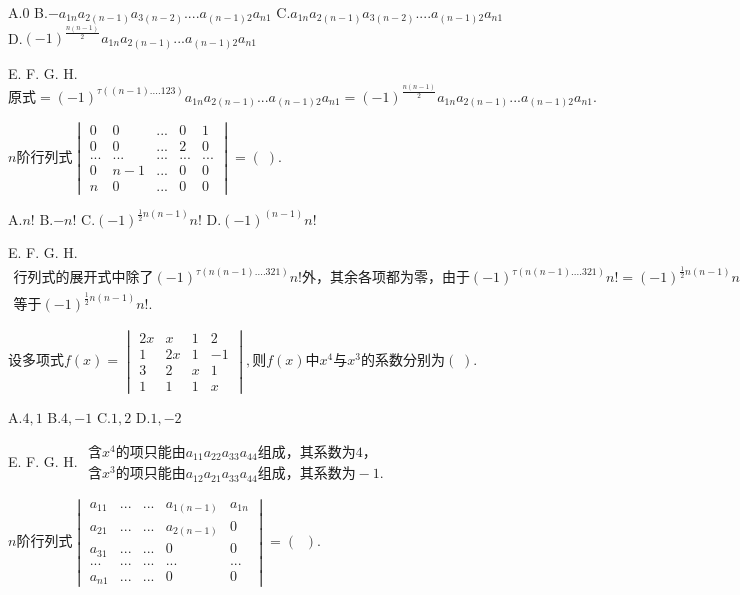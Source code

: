 A.$0$   B.$-a_{1n}a_{2(n-1)}a_{3(n-2)}....a_{(n-1)2}a_{n1}$   C.$a_{1n}a_{2(n-1)}a_{3(n-2)}....a_{(n-1)2}a_{n1}$   D.$(-1)^{\textstyle\frac{n(n-1)}2}{\textstyle{}^{}}a_{1n}a_{2(n-1)}...a_{(n-1)2}a_{n1}$

E.   F.   G.   H.
$\mathrm{原式}=(-1)^{\tau((n-1)....123)}a_{1n}a_{2(n-1)}...a_{(n-1)2}a_{n1}=(-1)^\frac{n(n-1)}2a_{1n}a_{2(n-1)}...a_{(n-1)2}a_{n1}.$


$n\mathrm{阶行列式}\begin{vmatrix}0&0&...&0&1\\0&0&...&2&0\\...&...&...&...&...\\0&n-1&...&0&0\\n&0&...&0&0\end{vmatrix}=(\;).$

A.$n!$   B.$-n!$   C.$(-1)^{{\textstyle\frac12}n(n-1)}n!$   D.$(-1)^{\textstyle(n-1)}n!$

E.   F.   G.   H.
$\begin{array}{l}\mathrm{行列式的展开式中除了}(-1)^{\textstyle\tau(n(n-1)....321)}n!外，\mathrm{其余各项都为零}，\mathrm{由于}(-1)^{\textstyle\tau(n(n-1)....321)}n!=(-1)^{{\textstyle\frac12}n(n-1)}n!,\mathrm{故原行列式}\\\mathrm{等于}(-1)^{\textstyle\frac12n(n-1)}n!.\end{array}$


$\mathrm{设多项式}f(x)=\begin{vmatrix}2x&x&1&2\\1&2x&1&-1\\3&2&x&1\\1&1&1&x\end{vmatrix},则f(x)中x^4与x^3\mathrm{的系数分别为}(\;).$

A.$4,1$   B.$4,-1$   C.$1,2$   D.$1,-2$

E.   F.   G.   H.
$\begin{array}{l}含x^4\mathrm{的项只能由}a_{11}a_{22}a_{33}a_{44}\mathrm{组成}，\mathrm{其系数为}4，\\含x^3\mathrm{的项只能由}a_{12}a_{21}a_{33}a_{44}\mathrm{组成}，\mathrm{其系数为}-1.\end{array}$


$n\mathrm{阶行列式}\begin{vmatrix}a_{11}&...&...&a_{1(n-1)}&a_{1n}\\a_{21}&...&...&a_{2(n-1)}&0\\a_{31}&...&...&0&0\\...&...&...&...&...\\a_{n1}&...&...&0&0\end{vmatrix}=(\;\;).$

